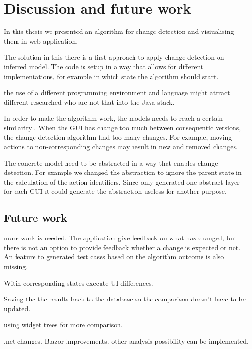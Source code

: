 \chapter{Discussion and future work}
In this thesis we presented an algorithm for change detection and visiualising them in web application. 



The solution in this there is a first approach to apply change detection on inferred model. The code is setup in a way that allows for different implementations, for example in which state the algorithm should start. 

the use of a different programming environment and language might attract different researched who are not that into the Java stack.

In order to make the algorithm work, the models needs to reach a certain similarity \cite{andrews2009visual}. When the GUI has change too much between consequentic versions, the change detection algorithm find too many changes. For example, moving actions to non-corresponding changes may result in new and removed changes. 

The concrete model need to be abstracted in a way that enables change detection. For example we changed the abstraction to ignore the parent state in the calculation of the action identifiers. Since \testar only generated one abstract layer for each GUI it could generate the abstraction useless for another purpose.



\section{Future work} \label{sec:future-work}

more work is needed. The application give feedback on what has changed, but there is not an option to provide feedback whether a change is expected or not. An feature to generated test cases based on the algorithm outcome is also missing. 


Witin corresponding states execute UI differences.

Saving the the results back to the database so the comparison doesn't have to be updated.

using widget trees for more comparison.

.net changes.
Blazor improvements. 
other analysis possibility can be implemented. 